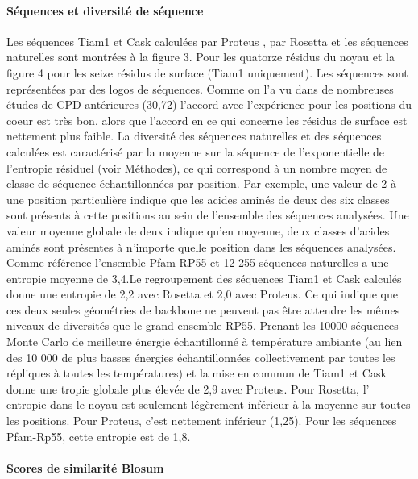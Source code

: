 \begin{enumarete}
\paragraph{Séquences et diversité de séquence}
Les séquences Tiam1 et Cask calculées par Proteus , par Rosetta et les séquences naturelles sont montrées à la figure 3. Pour les quatorze résidus du noyau et la figure 4 pour les seize résidus de surface (Tiam1  uniquement). Les séquences sont représentées par des logos de séquences. Comme on l'a vu dans de nombreuses études de CPD antérieures (30,72) l'accord avec l'expérience pour les positions du coeur est très bon, alors que l'accord en ce qui concerne les résidus de surface est nettement plus faible. La diversité des séquences naturelles et des séquences calculées est caractérisé par la moyenne sur la séquence de l'exponentielle de l'entropie résiduel (voir Méthodes), ce qui correspond à un nombre moyen de classe de séquence échantillonnées par position. Par exemple, une valeur de 2 à une position particulière indique que les acides aminés de deux des six classes sont présents à cette positions au sein de l'ensemble des séquences analysées. Une valeur moyenne globale de deux indique qu'en moyenne, deux classes d'acides aminés sont présentes à n'importe quelle position dans les séquences analysées. Comme référence l'ensemble Pfam RP55 et 12 255 séquences naturelles a une entropie moyenne de 3,4.Le regroupement des séquences Tiam1 et Cask calculés  donne une entropie de 2,2 avec Rosetta et 2,0 avec Proteus. Ce qui indique que ces deux seules géométries de backbone ne peuvent pas être attendre les mêmes niveaux de diversités que le grand ensemble RP55. Prenant les 10000 séquences Monte Carlo de meilleure énergie échantillonné à température ambiante (au lien des 10 000 de plus basses énergies échantillonnées collectivement par toutes les répliques à toutes les températures) et la mise en commun de Tiam1 et Cask donne une tropie globale plus élevée de 2,9 avec Proteus. Pour Rosetta, l' entropie dans le noyau est seulement légèrement inférieur à la moyenne sur toutes les positions. Pour Proteus, c'est nettement inférieur (1,25). Pour les séquences Pfam-Rp55, cette entropie est de 1,8.


\paragraph{Scores de similarité Blosum}


\end{enumarete}
